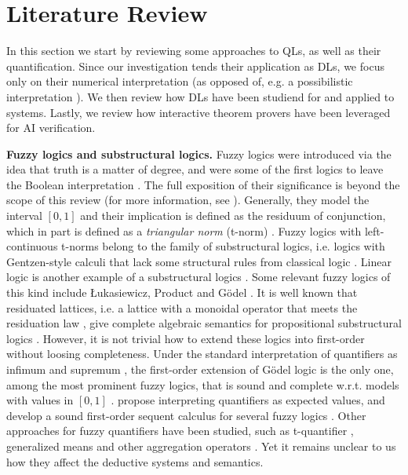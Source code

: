 \section{Literature Review} \label{section:LiteratureReview}

In this section we start by reviewing some approaches to QLs, as well as their quantification. Since our investigation tends their application as DLs, we focus only on their numerical interpretation (as opposed of, e.g. a possibilistic interpretation \citep{LIU19981}). %
We then review how DLs have been studiend for and applied to \InAI{} systems. Lastly, we review how interactive theorem provers have been leveraged for AI verification.

\textbf{Fuzzy logics and substructural logics.} Fuzzy logics were introduced via the idea that truth is a matter of degree, and were some of the first logics to leave the Boolean interpretation \citep{galatos2007residuated}. The full exposition of their significance is beyond the scope of this review (for more information, see \cite{cintula2011handbook, prooffuzzy}). Generally, they model the interval $[0,1]$ and their implication is defined as the residuum of conjunction, which in part is defined as a \emph{triangular norm} (t-norm) \citep{cintula2011handbook,prooffuzzy}. Fuzzy logics with left-continuous t-norms belong to the family of substructural logics, i.e. logics with Gentzen-style calculi that lack some structural rules from classical logic \citep{galatos2007residuated}. Linear logic is another example of a substructural logics \citep{agliano2025algebraic, galatos2007residuated}. Some relevant fuzzy logics of this kind include Łukasiewicz, Product and G\"{o}del \citep{cintula2011handbook,prooffuzzy}. It is well known that residuated lattices, i.e. a lattice with a monoidal operator that meets the residuation law \citep{galatos2007residuated}, give complete algebraic semantics for propositional substructural logics \citep{galatos2007residuated}. However, it is not trivial how to extend these logics into first-order without loosing completeness. Under the standard interpretation of quantifiers as infimum and supremum \citep{rescher1969many, cintula2011handbook}, the first-order extension of Gödel logic is the only one, among the most prominent fuzzy logics, that is sound and complete w.r.t. models with values in $[0,1]$ \citep{cintula2011handbook}. \citeauthor{slusarz2023logic} propose interpreting quantifiers as expected values, and develop a sound first-order sequent calculus for several fuzzy logics \citep{slusarz2023logic}. Other approaches for fuzzy quantifiers have been studied, such as t-quantifier \citep{LIU19981}, generalized means \citep{badreddine2022logic, slusarz2023logic} and other aggregation operators \citep{LIU19981}. Yet it remains unclear to us how they affect the deductive systems and semantics.

